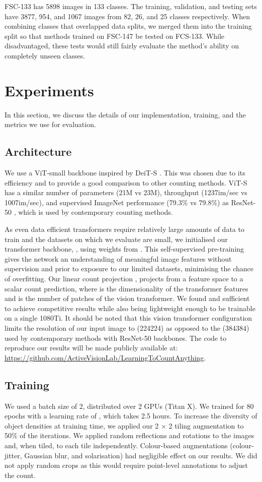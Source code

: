 \documentclass[letterpaper, 11pt]{IEEEtran}
\begin{document}
FSC-133 has 5898 images in 133 classes. The training, validation, and testing sets have 3877, 954, and 1067 images from 82, 26, and 25 classes respectively.
When combining classes that overlapped data splits, we merged them into the training split so that methods trained on FSC-147 be tested on FCS-133. While disadvantaged, these tests would still fairly evaluate the method's ability on completely unseen classes.


\section{Experiments}
\label{experiments}
In this section, we discuss the details of our implementation, training, and the metrics we use for evaluation.
\subsection{Architecture}
\label{experiments_implementationdetails}
We use a ViT-small backbone inspired by DeiT-S \cite{touvron2021training}. This was chosen due to its efficiency and to provide a good comparison to other counting methods.
ViT-S has a similar number of parameters (21M vs 23M), throughput (1237im/sec vs 1007im/sec), and supervised ImageNet performance (79.3\% vs 79.8\%) as ResNet-50 \cite{touvron2021training}, which is used by contemporary counting methods.

As even data efficient transformers require relatively large amounts of data to train and the datasets on which we evaluate are small, we initialised our transformer backbone, , using weights from \citet{caron2021DINO}. This self-supervised pre-training gives the network an understanding of meaningful image features without supervision and prior to exposure to our limited datasets, minimising the chance of overfitting. 
Our linear count projection , projects from a  feature space to a scalar count prediction,
where  is the dimensionality of the transformer features and  is the number of patches of the vision transformer. We found  and  sufficient to achieve competitive results while also being lightweight enough to be trainable on a single 1080Ti. It should be noted that this vision transformer configuration limits the resolution of our input image to (224224) as opposed to the (384384) used by contemporary methods with ResNet-50 backbones.
The code to reproduce our results will be made publicly available at: \url{https://github.com/ActiveVisionLab/LearningToCountAnything}.

\subsection{Training}
\label{experiments_training}
We used a batch size of 2, distributed over 2 GPUs (Titan X). We trained for 80 epochs with a learning rate of , which takes 2.5 hours.
To increase the diversity of object densities 
at training time, we applied our 2 × 2 tiling augmentation to 50\% of the iterations.
We applied random reflections and rotations to the images and, when tiled, to each tile independently. Colour-based augmentations (colour-jitter, Gaussian blur, and solarisation) had negligible effect on our results. We did not apply random crops as this would require point-level annotations to adjust the count. 
\end{document}

